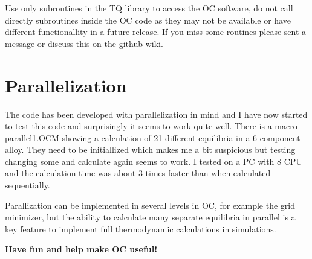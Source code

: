 \documentclass[12pt]{article}
\begin{document}
Use only subroutines in the TQ library to access the OC software, do
not call directly subroutines inside the OC code as they may not be
available or have different functionallity in a future release.  If
you miss some routines please sent a message or discuss this on the
github wiki.

\section{Parallelization}

The code has been developed with parallelization in mind and I have
now started to test this code and surprisingly it seems to work quite
well.  There is a macro parallel1.OCM showing a calculation of 21
different equilibria in a 6 component alloy.  They need to be
initiallized which makes me a bit suspicious but testing changing some
and calculate again seems to work.  I tested on a PC with 8 CPU and
the calculation time was about 3 times faster than when calculated
sequentially.

Parallization can be implemented in several levels in OC, for example
the grid minimizer, but the ability to calculate many separate
equilibria in parallel is a key feature to implement full
thermodynamic calculations in simulations.

\bigskip

{\large \bf Have fun and help make OC useful!}
\end{document}
